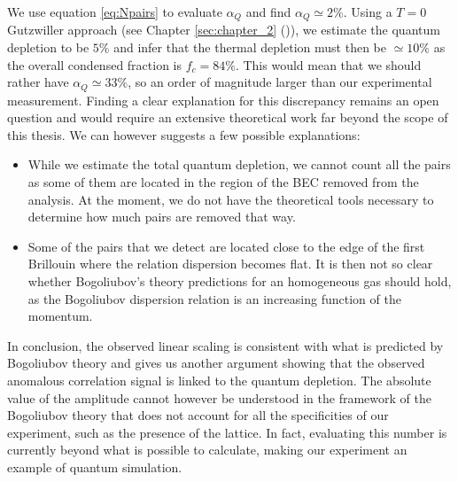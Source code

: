 We use equation \ref{eq:Npairs} to evaluate $\alpha_Q$ and find $\alpha_Q \simeq 2 \%$. Using a $T=0$ Gutzwiller approach (see Chapter \ref{sec:chapter_2} ()), we estimate the quantum depletion to be $5\%$ and infer that the thermal depletion must then be $\simeq 10\%$ as the overall condensed fraction is $f_c=84 \%$. This would mean that we should rather have $\alpha_Q \simeq 33 \%$, so an order of magnitude larger than our experimental measurement. Finding a clear explanation for this discrepancy remains an open question and would require an extensive theoretical work far beyond the scope of this thesis. We can however suggests a few possible explanations:

\begin{itemize}
    \item While we estimate the total quantum depletion, we cannot count all the pairs as some of them are located in the region of the BEC removed from the analysis. At the moment, we do not have the theoretical tools necessary to determine how much pairs are removed that way.
    \item Some of the pairs that we detect are located close to the edge of the first Brillouin where the relation dispersion becomes flat. It is then not so clear whether Bogoliubov's theory predictions for an homogeneous gas should hold, as the Bogoliubov dispersion relation is an increasing function of the momentum.
\end{itemize}

In conclusion, the observed linear scaling is consistent with what is predicted by Bogoliubov theory and gives us another argument showing that the observed anomalous correlation signal is linked to the quantum depletion. The absolute value of the amplitude cannot however be understood in the framework of the Bogoliubov theory that does not account for all the specificities of our experiment, such as the presence of the lattice. In fact, evaluating this number is currently beyond what is possible to calculate, making our experiment an example of quantum simulation.


